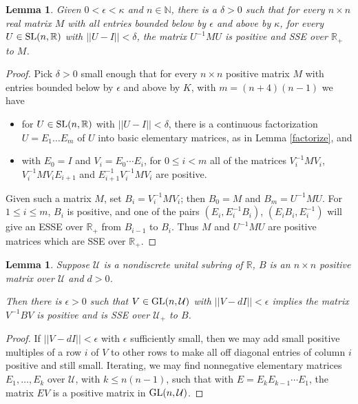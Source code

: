 \documentclass{amsart}
\newtheorem{lemma}[theorem]{Lemma}
\theoremstyle{definition}
\theoremstyle{remark}
\newcommand{\ri}{\mathcal U}
\numberwithin{equation}{section}
\begin{document}
{{\begin{lemma} \label{positiveclose}  
Given  $0<\epsilon< \kappa $ and $n\in \mathbb N$, 
there is a $\delta>0$ such that 
for every $n\times n$ real matrix $M$ with all entries 
bounded below by $\epsilon $ and above by $\kappa$, 
for every $U\in \textnormal{SL}(n,\mathbb R)$ with $||U-I||<\delta$, 
the matrix $U^{-1}MU$ is positive and SSE over $\mathbb R_+$ 
to $M$. 
\end{lemma} 
\begin{proof} 
Pick $\delta >0$ 
small enough that for every $n\times n$ 
positive matrix $M$ with entries 
bounded below by $\epsilon $ and above by $K$, 
with $m=(n+4)(n-1)$ we have 
\begin{itemize} 
\item 
for $U\in \textnormal{SL}(n,\mathbb R)$ with $||U-I||< \delta$, there is a 
continuous factorization $U=E_1 \dots E_m$ of $U$ into 
basic elementary matrices, as in Lemma \ref{factorize}, and  
\item 
with $E_0=I$ and $V_i = E_0\cdots E_i$, for $0\leq i <m$ 
all of the matrices $V_i^{-1}MV_{i}$, $V_i^{-1}MV_{i}E_{i+1}$ and 
$E_{i+1}^{-1}V_i^{-1}MV_{i}$ are positive.  
\end{itemize} 
Given such a matrix $M$, 
set $B_i = V_i^{-1}MV_i$; then $B_0 = M$ and $B_m=U^{-1}MU$. 
For $1\leq i \leq m$,  $B_i$ is positive, and 
one 
of the pairs $(E_i, E_i^{-1}B_i)$, $(E_iB_i, E_i^{-1})$ will give an ESSE 
over $\mathbb R_+$ from $B_{i-1}$ to $B_{i}$. Thus $M$ and $U^{-1}MU$ are 
positive matrices which are SSE over $\mathbb R_+$. 
\end{proof} 

\begin{lemma} \label{diagonal} 
Suppose $\ri$ is 
a nondiscrete unital subring 
 of $\mathbb R$,
$B$ is an $n\times n$ 
 positive matrix over $\ri$ and   $d>0$. 


Then there is $\epsilon > 0$ such that 
 $V\in \textnormal{GL}(n,\mathcal U)$ 
with 
$||V-dI||<\epsilon $ implies the matrix 
$V^{-1}BV$ is  positive and is  SSE over $\ri_+$ 
to $B$. 
\end{lemma} 
\begin{proof} 
If $||V-dI||<\epsilon $ 
with $\epsilon $  sufficiently small, then we may add 
small positive multiples of a row $i$ of $V$ to other rows to 
make all off diagonal entries of column $i$ positive and still small. 
Iterating, 
we may find  nonnegative elementary matrices $E_1, \dots , 
E_k$ over $\ri$, with $k\leq n(n-1)$, such that 
with $E=E_kE_{k-1}\cdots E_1$, the matrix 
$EV$ is a positive matrix in $\textnormal{GL}(n,\ri)$. 


\end{proof}}}
\end{document}
